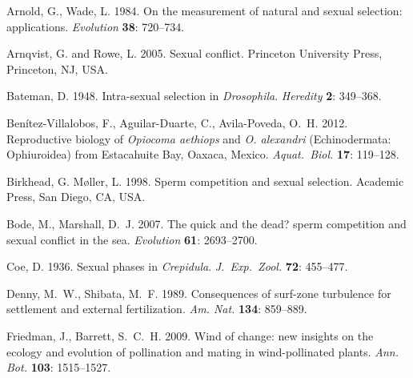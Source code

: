 \documentclass{article}
\begin{document}
\newpage{}







\begin{thebibliography}{}

Arnold, G., Wade, L. 1984.
\newblock On the measurement of natural and sexual selection: applications.
\newblock \textit{Evolution} \textbf{38}: 720--734.

Arnqvist, G. and Rowe, L. 2005.
\newblock Sexual conflict.
\newblock Princeton University Press, Princeton, NJ, USA.

Bateman, D. 1948.
\newblock Intra-sexual selection in \textit{Drosophila}.
\newblock \textit{Heredity} \textbf{2}: 349--368.

Ben\'{i}tez-Villalobos, F., Aguilar-Duarte, C., Avila-Poveda, O.~H. 2012.
\newblock Reproductive biology of \textit{Opiocoma aethiops} and \textit{O. alexandri} (Echinodermata: Ophiuroidea) from Estacahuite Bay, Oaxaca, Mexico.
\newblock \textit{Aquat.~Biol.} \textbf{17}: 119--128.

Birkhead, G. M{\o}ller, L. 1998.
\newblock Sperm competition and sexual selection.
\newblock Academic Press, San Diego, CA, USA.

Bode, M., Marshall, D.~J. 2007.
\newblock The quick and the dead? sperm competition and sexual conflict in the sea.
\newblock \textit{Evolution} \textbf{61}: 2693--2700.

Coe, D. 1936.
\newblock Sexual phases in \textit{Crepidula}.
\newblock \textit{J.~Exp.~Zool.} \textbf{72}: 455--477.

Denny, M.~W., Shibata, M.~F. 1989.
\newblock Consequences of surf-zone turbulence for settlement and external fertilization.
\newblock \textit{Am. Nat.} \textbf{134}: 859--889.

Friedman, J., Barrett, S.~C.~H. 2009.
\newblock Wind of change: new insights on the ecology and evolution of pollination and mating in wind-pollinated plants.
\newblock \textit{Ann. Bot.} \textbf{103}: 1515--1527.


\end{thebibliography}
\end{document}
